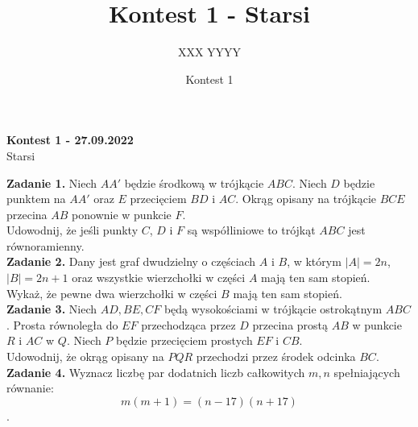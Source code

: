 \documentclass[zad,zawodnik,utf8]{sinol}
\title{Kontest 1 - Starsi}
\author{XXX YYYY}
\date{Kontest 1}
\begin{document}
    \begin{center}
        \textbf{\huge Kontest 1 - 27.09.2022} \\ 
        \vspace{0.5cm}
        \Large{Starsi}
    \end{center}
    \Large{
        \textbf{Zadanie 1.} Niech $AA'$ będzie środkową w trójkącie $ABC$. Niech $D$ będzie punktem na $AA'$ oraz $E$ przecięciem $BD$ i $AC$. Okrąg opisany na trójkącie $BCE$ przecina $AB$ ponownie w punkcie $F$. \\ Udowodnij, że jeśli punkty $C$, $D$ i $F$ są współliniowe to trójkąt $ABC$ jest równoramienny. \\
        
        \textbf{Zadanie 2.} Dany jest graf dwudzielny o częściach $A$ i $B$, w którym $|A|=2n$, $|B|=2n+1$ oraz wszystkie wierzchołki w części $A$ mają ten sam stopień. \\
        Wykaż, że pewne dwa wierzchołki w części $B$ mają ten sam stopień. \\
        
        \textbf{Zadanie 3.}  Niech $AD,BE,CF$ będą wysokościami w trójkącie ostrokątnym $ABC$. Prosta równoległa do $EF$ przechodząca przez $D$ przecina prostą $AB$ w punkcie $R$ i $AC$ w $Q$. Niech $P$ będzie przecięciem prostych $EF$ i $CB$. \\ 
        Udowodnij, że okrąg opisany na $PQR$ przechodzi przez środek odcinka $BC$. \\
        
        \textbf{Zadanie 4.} Wyznacz liczbę par dodatnich liczb całkowitych $m,n$ spełniających równanie: $$m(m+1)=(n-17)(n+17)$$.
    }
\end{document}
